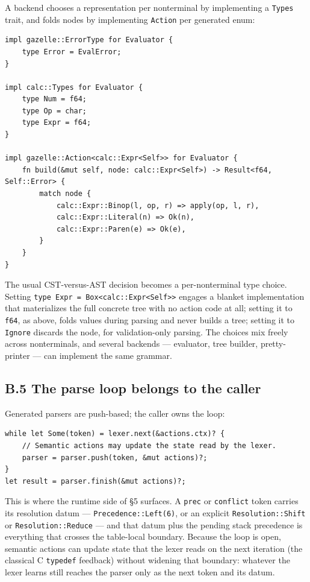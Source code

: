 \documentclass[
  10pt,
]{article}
\begin{document}
A backend chooses a representation per nonterminal by implementing a
\texttt{Types} trait, and folds nodes by implementing \texttt{Action}
per generated enum:

\begin{verbatim}
impl gazelle::ErrorType for Evaluator {
    type Error = EvalError;
}

impl calc::Types for Evaluator {
    type Num = f64;
    type Op = char;
    type Expr = f64;
}

impl gazelle::Action<calc::Expr<Self>> for Evaluator {
    fn build(&mut self, node: calc::Expr<Self>) -> Result<f64, Self::Error> {
        match node {
            calc::Expr::Binop(l, op, r) => apply(op, l, r),
            calc::Expr::Literal(n) => Ok(n),
            calc::Expr::Paren(e) => Ok(e),
        }
    }
}
\end{verbatim}

The usual CST-versus-AST decision becomes a per-nonterminal type choice.
Setting \texttt{type\ Expr\ =\ Box\textless{}calc::Expr\textless{}Self\textgreater{}\textgreater{}}
engages a blanket implementation that materializes the full concrete
tree with no action code at all; setting it to \texttt{f64}, as above,
folds values during parsing and never builds a tree; setting it to
\texttt{Ignore} discards the node, for validation-only parsing. The
choices mix freely across nonterminals, and several backends ---
evaluator, tree builder, pretty-printer --- can implement the same
grammar.

\hypertarget{b5-the-parse-loop-belongs-to-the-caller}{%
\subsection{B.5 The parse loop belongs to the
caller}\label{b5-the-parse-loop-belongs-to-the-caller}}

Generated parsers are push-based; the caller owns the loop:

\begin{verbatim}
while let Some(token) = lexer.next(&actions.ctx)? {
    // Semantic actions may update the state read by the lexer.
    parser = parser.push(token, &mut actions)?;
}
let result = parser.finish(&mut actions)?;
\end{verbatim}

This is where the runtime side of §5 surfaces. A \texttt{prec} or
\texttt{conflict} token carries its resolution datum ---
\texttt{Precedence::Left(6)}, or an explicit
\texttt{Resolution::Shift} or \texttt{Resolution::Reduce} --- and that
datum plus the pending stack precedence is everything that crosses the
table-local boundary. Because the loop is open, semantic actions can
update state that the lexer reads on the next iteration (the classical C
\texttt{typedef} feedback) without widening that boundary: whatever the
lexer learns still reaches the parser only as the next token and its
datum.
\end{document}
